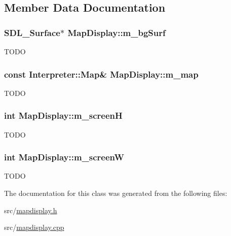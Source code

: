 \subsection{Member Data Documentation}
\hypertarget{classMapDisplay_a8c4cc4b6d6a5f1608ca2a3eb9a5e3290}{
\subsubsection[{m\_\-bgSurf}]{\setlength{\rightskip}{0pt plus 5cm}SDL\_\-Surface$\ast$ {\bf MapDisplay::m\_\-bgSurf}}}
\label{classMapDisplay_a8c4cc4b6d6a5f1608ca2a3eb9a5e3290}
TODO \hypertarget{classMapDisplay_a218c5b07ae7b9622a606faa613d7eaa9}{
\subsubsection[{m\_\-map}]{\setlength{\rightskip}{0pt plus 5cm}const {\bf Interpreter::Map}\& {\bf MapDisplay::m\_\-map}}}
\label{classMapDisplay_a218c5b07ae7b9622a606faa613d7eaa9}
TODO \hypertarget{classMapDisplay_a3a6a2f7b6501945628fbfe022914daed}{
\subsubsection[{m\_\-screenH}]{\setlength{\rightskip}{0pt plus 5cm}int {\bf MapDisplay::m\_\-screenH}}}
\label{classMapDisplay_a3a6a2f7b6501945628fbfe022914daed}
TODO \hypertarget{classMapDisplay_a31f9d5788c440d1ef0fca5729103ab05}{
\subsubsection[{m\_\-screenW}]{\setlength{\rightskip}{0pt plus 5cm}int {\bf MapDisplay::m\_\-screenW}}}
\label{classMapDisplay_a31f9d5788c440d1ef0fca5729103ab05}
TODO 

The documentation for this class was generated from the following files:\begin{DoxyCompactItemize}
\item 
src/\hyperlink{mapdisplay_8h}{mapdisplay.h}\item 
src/\hyperlink{mapdisplay_8cpp}{mapdisplay.cpp}\end{DoxyCompactItemize}
